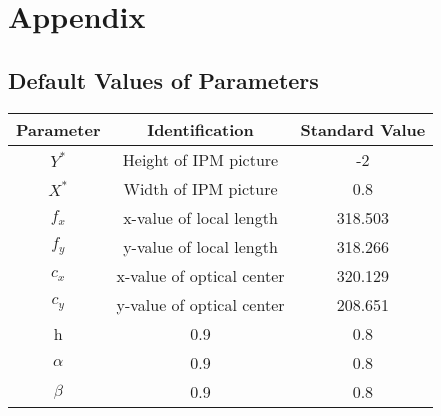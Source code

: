 %
\appendix 
\chapter{Appendix} 
\section{Default Values of Parameters} 


\begin{center}
  \begin{tabular}{ | c | c | c | }
    \hline
    Parameter & Identification				  &  Standard Value   \\ \hline
    $ Y^{*} $ & Height of IPM picture  		  &  -2   \\ \hline
    $ X^{*} $ & Width of IPM picture  		  &  0.8  \\ \hline
    $ f_{x} $ & x-value of local length 	  &  318.503  \\ \hline
    $ f_{y} $ & y-value of local length 	  &  318.266  \\ \hline
    $ c_{x} $ & x-value of optical center	  &  320.129  \\ \hline
    $ c_{y} $ & y-value of optical center	  &  208.651  \\ \hline
    h		  & 0.9 &  0.8  \\ \hline
    $ \alpha $& 0.9 &  0.8  \\ \hline
    $ \beta $ & 0.9 &  0.8  \\ \hline


  \end{tabular}
  \label{tab:parameters}
\end{center}

%